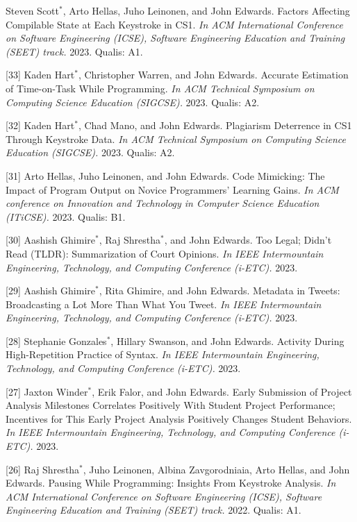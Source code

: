 \documentclass[margin,line]{res}
\newcommand{\cnum}[1]{[#1]}
\begin{document}
\begin{resume}
\cnum{34} Steven Scott$^*$, Arto Hellas, Juho Leinonen, and John Edwards. Factors Affecting Compilable State at Each Keystroke in CS1. \textit{In ACM International Conference on Software Engineering (ICSE), Software Engineering Education and Training (SEET) track.} 2023. Qualis: A1.

\cnum{33} Kaden Hart$^*$, Christopher Warren, and John Edwards. Accurate Estimation of Time-on-Task While Programming. \textit{In ACM Technical Symposium on Computing Science Education (SIGCSE).} 2023. Qualis: A2.

\cnum{32} Kaden Hart$^*$, Chad Mano, and John Edwards. Plagiarism Deterrence in CS1 Through Keystroke Data. \textit{In ACM Technical Symposium on Computing Science Education (SIGCSE).} 2023. Qualis: A2.

\cnum{31} Arto Hellas, Juho Leinonen, and John Edwards. Code Mimicking: The Impact of Program Output on Novice Programmers’ Learning Gains. \textit{In ACM conference on Innovation and Technology in Computer Science Education (ITiCSE).} 2023. Qualis: B1.

\cnum{30} Aashish Ghimire$^*$, Raj Shrestha$^*$, and John Edwards. Too Legal; Didn’t Read (TLDR): Summarization of Court Opinions. \textit{In IEEE Intermountain Engineering, Technology, and Computing Conference (i-ETC).} 2023.

\cnum{29} Aashish Ghimire$^*$, Rita Ghimire, and John Edwards. Metadata in Tweets: Broadcasting a Lot More Than What You Tweet. \textit{In IEEE Intermountain Engineering, Technology, and Computing Conference (i-ETC).} 2023.

\cnum{28} Stephanie Gonzales$^*$, Hillary Swanson, and John Edwards. Activity During High-Repetition Practice of Syntax. \textit{In IEEE Intermountain Engineering, Technology, and Computing Conference (i-ETC).} 2023.

\cnum{27} Jaxton Winder$^*$, Erik Falor, and John Edwards. Early Submission of Project Analysis Milestones Correlates Positively With Student Project Performance; Incentives for This Early Project Analysis Positively Changes Student Behaviors. \textit{In IEEE Intermountain Engineering, Technology, and Computing Conference (i-ETC).} 2023.

\cnum{26} Raj Shrestha$^*$, Juho Leinonen, Albina Zavgorodniaia, Arto Hellas, and John Edwards. Pausing While Programming: Insights From Keystroke Analysis. \textit{In ACM International Conference on Software Engineering (ICSE), Software Engineering Education and Training (SEET) track.} 2022. Qualis: A1.


\end{resume}
\end{document}
